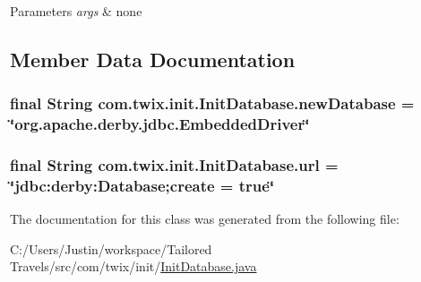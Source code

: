\begin{DoxyParams}{Parameters}
{\em args} & none \\
\hline
\end{DoxyParams}


\subsection{Member Data Documentation}
\hypertarget{classcom_1_1twix_1_1init_1_1_init_database_a31f1547285d8a43059fb42acf8438434}{
\subsubsection[{new\-Database}]{\setlength{\rightskip}{0pt plus 5cm}final String com.\-twix.\-init.\-Init\-Database.\-new\-Database = \char`\"{}org.\-apache.\-derby.\-jdbc.\-Embedded\-Driver\char`\"{}\hspace{0.3cm}{\ttfamily [static]}}}\label{classcom_1_1twix_1_1init_1_1_init_database_a31f1547285d8a43059fb42acf8438434}
\hypertarget{classcom_1_1twix_1_1init_1_1_init_database_a5e9de9bc6a80da907b9b8ef40c6683b4}{
\subsubsection[{url}]{\setlength{\rightskip}{0pt plus 5cm}final String com.\-twix.\-init.\-Init\-Database.\-url = \char`\"{}jdbc\-:derby\-:\-Database;create = true\char`\"{}\hspace{0.3cm}{\ttfamily [static]}}}\label{classcom_1_1twix_1_1init_1_1_init_database_a5e9de9bc6a80da907b9b8ef40c6683b4}


The documentation for this class was generated from the following file\-:\begin{DoxyCompactItemize}
\item 
C\-:/\-Users/\-Justin/workspace/\-Tailored Travels/src/com/twix/init/\hyperlink{_init_database_8java}{Init\-Database.\-java}\end{DoxyCompactItemize}
